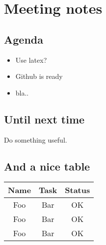 \documentclass[a4paper]{article}
\begin{document}
	

	\section{Meeting notes}
		\subsection{Agenda}
			\begin{itemize}
				\item Use latex?
				\item Github is ready
				\item bla..
			\end{itemize}
		
		\subsection{Until next time}
			Do something useful.

		\subsection{And a nice table}
			\begin{tabular}{|c|c|c|}
				\hline
				Name & Task & Status \\ 
				\hline \hline
				Foo & Bar & OK \\
				Foo & Bar & OK \\
				Foo & Bar & OK \\
				\hline
			\end{tabular}	
\end{document}
